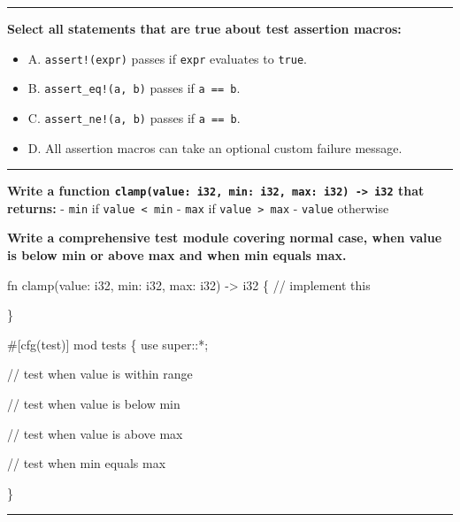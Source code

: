 \documentclass[
  11pt,
]{article}
\newenvironment{Shaded}{}{}
\newcommand{\NormalTok}[1]{#1}
\providecommand{\tightlist}{%
  \setlength{\itemsep}{0pt}\setlength{\parskip}{0pt}}
\begin{document}
\begin{center}\rule{0.5\linewidth}{0.5pt}\end{center}

\textbf{Select all statements that are true about test assertion
macros:}

\begin{itemize}
\tightlist
\item[$\square$]
  A. \texttt{assert!(expr)} passes if \texttt{expr} evaluates to
  \texttt{true}.
\item[$\square$]
  B. \texttt{assert\_eq!(a,\ b)} passes if \texttt{a\ ==\ b}.
\item[$\square$]
  C. \texttt{assert\_ne!(a,\ b)} passes if \texttt{a\ ==\ b}.
\item[$\square$]
  D. All assertion macros can take an optional custom failure message.
\end{itemize}

\begin{center}\rule{0.5\linewidth}{0.5pt}\end{center}

\textbf{Write a function
\texttt{clamp(value:\ i32,\ min:\ i32,\ max:\ i32)\ -\textgreater{}\ i32}
that returns:} - \texttt{min} if \texttt{value\ \textless{}\ min} -
\texttt{max} if \texttt{value\ \textgreater{}\ max} - \texttt{value}
otherwise

\textbf{Write a comprehensive test module covering normal case, when
value is below min or above max and when min equals max.}

\begin{Shaded}
\begin{Highlighting}[]
\NormalTok{fn clamp(value: i32, min: i32, max: i32) {-}\textgreater{} i32 \{}
\NormalTok{    // implement this}

\NormalTok{\}}

\NormalTok{\#[cfg(test)]}
\NormalTok{mod tests \{}
\NormalTok{    use super::*;}

\NormalTok{    // test when value is within range}

\NormalTok{    // test when value is below min}

\NormalTok{    // test when value is above max}

\NormalTok{    // test when min equals max}

\NormalTok{\}}
\end{Highlighting}
\end{Shaded}

\begin{center}\rule{0.5\linewidth}{0.5pt}\end{center}
\end{document}
